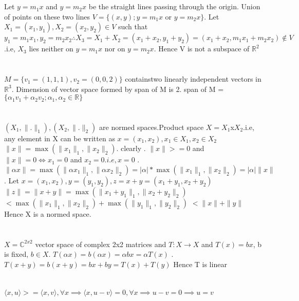 \documentclass[12pt,a4paper]{article}
\begin{document}
		\section{}
		Let $y=m_1x$ and $y=m_2x$ be the straight lines passing through the origin. Union of points on these two lines $ V = \{(x,y); y = m_1x$ or  $y = m_2x\}$. Let $ X_1=(x_1,y_1), X_2=(x_2,y_2) \in V$ such that $y_1 = m_1x_1 ,y_2=m_2x_2  \therefore X_3 = X_1+X_2 = (x_1+x_2, y_1+y_2)= (x_1+x_2, m_1x_1+m_2x_2) \notin V$.i.e, $X_3$ lies neither on $y=m_1x$ nor on $y=m_2x$. Hence V is not a subspace of $\mathbb{R}^2$
		
		\section{}
		$M=\{v_1=(1,1,1),v_2=(0,0,2)\}$ containstwo linearly independent vectors in $\mathbb{R}^3$. Dimension of vector space formed by span of M is 2.\newline
		span of M = $\{\alpha_1v_1+\alpha_2v_2; \alpha_1, \alpha_2 \in \mathbb{R}\}$
		
		\section{}
		$(X_1, \|.\|_1), (X_2, \|.\|_2)$ are normed spaces.Product space $ X = X_1$x$X_2$.i.e, any element in X can be written as $x= (x_1,x_2), x_1 \in X_1, x_2 \in X_2$ \newline
		$\|x\| = \max(\|x_1\|_1,\|x_2\|_2)$. clearly . $\|x\| >= 0 $ and $ \|x\| = 0 \iff x_1=0$ and $x_2=0.i.e, x=0$ . $\|\alpha x\| = \max(\|\alpha x_1\|_1,\|\alpha x_2\|_2) = |\alpha|*\max(\|x_1\|_1,\|x_2\|_2) = |\alpha|\|x\|$. Let $x= (x_1,x_2), y= (y_1,y_2) , z=x+y= (x_1+y_1,x_2+y_2)$ \newline
		\hspace*{3ex}$\|z\|= \|x+y\| = \max(\|x_1+y_1\|_1,\|x_2+y_2\|_2)$ \newline
		\hspace*{7ex}$< \max(\|x_1\|_1,\|x_2\|_2) + \max(\|y_1\|_1,\|y_2\|_2)$ \newline
		\hspace*{7ex}$< \|x\| + \|y\| $ \newline
		Hence X is a normed space.
		
		\section{}
		$X = \mathbb{C}^{2x2}$ vector space of complex 2x2 matrices and $T:X\rightarrow X$ and $T(x) = bx$, b is fixed, $ b \in X$. $T(\alpha x) = b(\alpha x) = \alpha bx = \alpha T(x)$ . $T(x+y) = b(x+y) = bx+by = T(x)+T(y) $ \newline
		Hence T is linear
		
		\section{}
		$\langle x,u \rangle> = \langle x,v \rangle, \forall x \implies \langle x, u-v \rangle = 0, \forall x \implies u-v = 0 \implies u=v $
		
\end{document}
